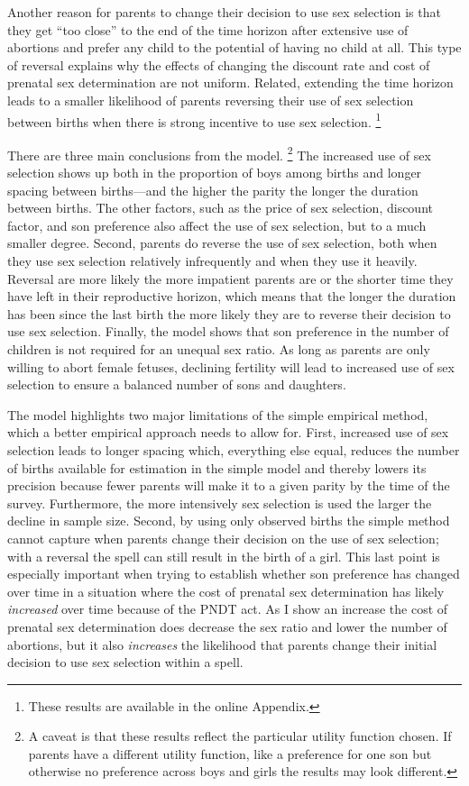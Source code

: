 \documentclass[12pt,letterpaper]{article}
\begin{document}
Another reason for parents to change their decision to use sex
selection is that they get ``too close'' to the end of the time
horizon after extensive use of abortions and prefer any child to 
the potential of having no child at all.
This type of reversal explains why the effects of changing the discount 
rate and cost of prenatal sex determination are not uniform.
Related, extending the time horizon leads to a smaller likelihood of parents 
reversing their use of sex selection between births when
there is strong incentive to use sex selection.%
\footnote{
These results are available in the online Appendix.
}



There are three main conclusions from the model.%
\footnote{
A caveat is that these results reflect the particular utility 
function chosen.
If parents have a different utility function, like a preference
for one son but otherwise no preference across boys and girls
the results may look different.
}
The increased use of sex selection shows up both in the 
proportion of boys among births and longer spacing between 
births---and the higher the parity the longer the duration between 
births.
The other factors, such as the price of sex selection, 
discount factor, and son preference also affect the use
of sex selection, but to a much smaller degree.
Second, parents do reverse the use of sex selection, 
both when they use sex selection relatively infrequently and when 
they use it heavily.
Reversal are more likely the more impatient parents are or the
shorter time they have left in their reproductive horizon, which
means that the longer the duration has been since the last birth
the more likely they are to reverse their decision to use sex selection.
Finally, the model shows that son preference in the number of
children is not required for an unequal sex ratio.
As long as parents are only willing to abort female fetuses, declining
fertility will lead to increased use of sex selection to ensure 
a balanced number of sons and daughters.


The model highlights two major limitations of the simple 
empirical method, which a better empirical approach needs to 
allow for.
First, increased use of sex selection leads to longer spacing which,
everything else equal, reduces the number of births available for 
estimation in the simple model and thereby lowers its precision
because fewer parents will make it to a given parity by the time of the survey.
Furthermore, the more intensively sex selection is used the larger 
the decline in sample size.
Second, by using only observed births the simple method cannot capture
when parents change their decision on the use of sex selection;
with a reversal the spell can still result in the birth of a girl.
This last point is especially important when trying to establish whether 
son preference has changed over time in a situation where the cost of prenatal 
sex determination has likely \emph{increased} over time because of the PNDT act.
As I show an increase the cost of prenatal sex determination does 
decrease the sex ratio and lower the number of abortions, but 
it also \emph{increases} the likelihood that parents change their initial
decision to use sex selection within a spell.
\end{document}
